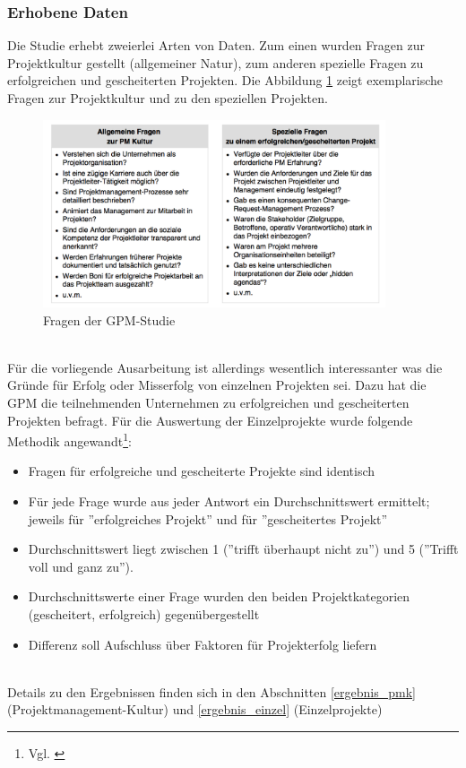 \documentclass[11pt]{scrartcl}
\begin{document}
\subsubsection{Erhobene Daten}
\label{erhobene_daten}
Die Studie erhebt zweierlei Arten von Daten. Zum einen wurden Fragen zur Projektkultur gestellt (allgemeiner Natur), zum anderen spezielle Fragen zu erfolgreichen und gescheiterten Projekten. Die Abbildung \ref{fragen_gpm_studie} zeigt exemplarische Fragen zur Projektkultur und zu den speziellen Projekten. 

\begin{figure}[H]
	\begin{center}
		\includegraphics[width=0.9\textwidth]{img/fragen_gpm_studie}
		\caption{Fragen der GPM-Studie}
		\label{fragen_gpm_studie}	
	\end{center}
\end{figure}
\ 
\\
Für die vorliegende Ausarbeitung ist allerdings wesentlich interessanter was die Gründe für Erfolg oder Misserfolg von einzelnen Projekten sei. Dazu hat die GPM die teilnehmenden Unternehmen zu erfolgreichen und gescheiterten Projekten befragt. Für die Auswertung der Einzelprojekte wurde folgende Methodik angewandt\footnote{Vgl. \cite{GPM_Studie_2008, Seite 9}}:
\begin{itemize}
    \item{Fragen für erfolgreiche und gescheiterte Projekte sind identisch}
    \item{Für jede Frage wurde aus jeder Antwort ein Durchschnittswert ermittelt; jeweils für ''erfolgreiches Projekt'' und für ''gescheitertes Projekt''}
    \item{Durchschnittswert liegt zwischen 1 (''trifft überhaupt nicht zu'') und 5 (''Trifft voll und ganz zu'').}
    \item{Durchschnittswerte einer Frage wurden den beiden Projektkategorien (gescheitert, erfolgreich) gegenübergestellt}
    \item{Differenz soll Aufschluss über Faktoren für Projekterfolg liefern}
\end{itemize}
\
\\
Details zu den Ergebnissen finden sich in den Abschnitten \ref{ergebnis_pmk} (Projektmanagement-Kultur) und \ref{ergebnis_einzel} (Einzelprojekte)
\end{document}
